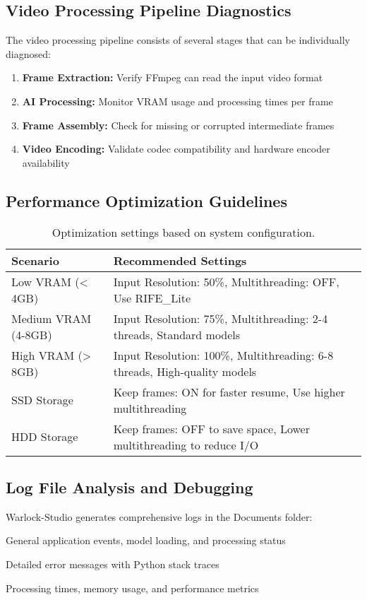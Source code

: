 \documentclass[11pt, a4paper]{article}
\begin{document}
\subsection{Video Processing Pipeline Diagnostics}
The video processing pipeline consists of several stages that can be individually diagnosed:
\begin{enumerate}[leftmargin=*]
    \item \textbf{Frame Extraction:} Verify FFmpeg can read the input video format
    \item \textbf{AI Processing:} Monitor VRAM usage and processing times per frame
    \item \textbf{Frame Assembly:} Check for missing or corrupted intermediate frames
    \item \textbf{Video Encoding:} Validate codec compatibility and hardware encoder availability
\end{enumerate}

\subsection{Performance Optimization Guidelines}
\begin{table}[H]
    \centering
    \small
    \begin{tabularx}{\textwidth}{l X}
        \toprule
        \textbf{Scenario} & \textbf{Recommended Settings} \\
        \midrule
        Low VRAM (< 4GB) & Input Resolution: 50\%, Multithreading: OFF, Use RIFE\_Lite \\
        Medium VRAM (4-8GB) & Input Resolution: 75\%, Multithreading: 2-4 threads, Standard models \\
        High VRAM (> 8GB) & Input Resolution: 100\%, Multithreading: 6-8 threads, High-quality models \\
        SSD Storage & Keep frames: ON for faster resume, Use higher multithreading \\
        HDD Storage & Keep frames: OFF to save space, Lower multithreading to reduce I/O \\
        \bottomrule
    \end{tabularx}
    \caption{Optimization settings based on system configuration.}
\end{table}

\subsection{Log File Analysis and Debugging}
Warlock-Studio generates comprehensive logs in the Documents folder:
\begin{description}[leftmargin=*, style=nextline]
    \item[warlock\_studio.log:] General application events, model loading, and processing status
    \item[error\_log.txt:] Detailed error messages with Python stack traces
    \item[performance\_log.txt:] Processing times, memory usage, and performance metrics
\end{description}
\end{document}

